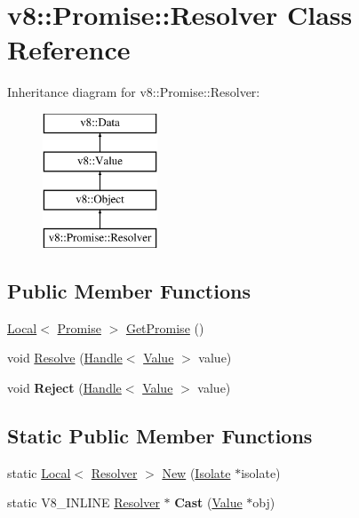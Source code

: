 \hypertarget{classv8_1_1_promise_1_1_resolver}{}\section{v8\+:\+:Promise\+:\+:Resolver Class Reference}
\label{classv8_1_1_promise_1_1_resolver}
Inheritance diagram for v8\+:\+:Promise\+:\+:Resolver\+:\begin{figure}[H]
\begin{center}
\leavevmode
\includegraphics[height=4.000000cm]{classv8_1_1_promise_1_1_resolver}
\end{center}
\end{figure}
\subsection*{Public Member Functions}
\begin{DoxyCompactItemize}
\item 
\hyperlink{classv8_1_1_local}{Local}$<$ \hyperlink{classv8_1_1_promise}{Promise} $>$ \hyperlink{classv8_1_1_promise_1_1_resolver_a41fd1ffef546a62e363a639935fc8ae3}{Get\+Promise} ()
\item 
void \hyperlink{classv8_1_1_promise_1_1_resolver_aa1f7f6883d57879a7956e84e63b2d935}{Resolve} (\hyperlink{classv8_1_1_handle}{Handle}$<$ \hyperlink{classv8_1_1_value}{Value} $>$ value)
\item 
\hypertarget{classv8_1_1_promise_1_1_resolver_a12b1f6ef41dd7d759443631135502847}{}void {\bfseries Reject} (\hyperlink{classv8_1_1_handle}{Handle}$<$ \hyperlink{classv8_1_1_value}{Value} $>$ value)\label{classv8_1_1_promise_1_1_resolver_a12b1f6ef41dd7d759443631135502847}

\end{DoxyCompactItemize}
\subsection*{Static Public Member Functions}
\begin{DoxyCompactItemize}
\item 
static \hyperlink{classv8_1_1_local}{Local}$<$ \hyperlink{classv8_1_1_promise_1_1_resolver}{Resolver} $>$ \hyperlink{classv8_1_1_promise_1_1_resolver_a80b9e402b6b49f41d57d404ed9e00c9d}{New} (\hyperlink{classv8_1_1_isolate}{Isolate} $\ast$isolate)
\item 
\hypertarget{classv8_1_1_promise_1_1_resolver_ab2b541cb210158ed0c757c8b7dc46279}{}static V8\+\_\+\+I\+N\+L\+I\+N\+E \hyperlink{classv8_1_1_promise_1_1_resolver}{Resolver} $\ast$ {\bfseries Cast} (\hyperlink{classv8_1_1_value}{Value} $\ast$obj)\label{classv8_1_1_promise_1_1_resolver_ab2b541cb210158ed0c757c8b7dc46279}

\end{DoxyCompactItemize}


